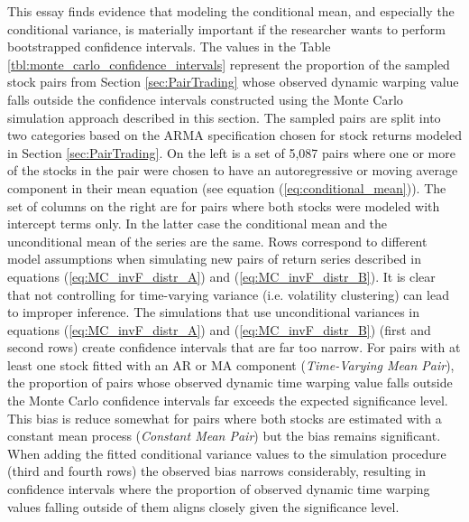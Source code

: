\documentclass[12pt]{report}
\begin{document}
This essay finds evidence that modeling the conditional mean, and especially the conditional variance, is materially important if the researcher wants to perform bootstrapped confidence intervals. The values in the Table \ref{tbl:monte_carlo_confidence_intervals} represent the proportion of the sampled stock pairs from Section \ref{sec:PairTrading} whose observed dynamic warping value falls outside the confidence intervals constructed using the Monte Carlo simulation approach described in this section. The sampled pairs are split into two categories based on the ARMA specification chosen for stock returns modeled in Section \ref{sec:PairTrading}. On the left is a set of 5,087 pairs where one or more of the stocks in the pair were chosen to have an autoregressive or moving average component in their mean equation (see equation (\ref{eq:conditional_mean})). The set of columns on the right are for pairs where both stocks were modeled with intercept terms only. In the latter case the conditional mean and the unconditional mean of the series are the same. Rows correspond to different model assumptions when simulating new pairs of return series described in equations (\ref{eq:MC_invF_distr_A}) and (\ref{eq:MC_invF_distr_B}). It is clear that not controlling for time-varying variance (i.e. volatility clustering) can lead to improper inference. The simulations that use unconditional variances in equations (\ref{eq:MC_invF_distr_A}) and (\ref{eq:MC_invF_distr_B}) (first and second rows) create confidence intervals that are far too narrow. For pairs with at least one stock fitted with an AR or MA component (\textit{Time-Varying Mean Pair}), the proportion of pairs whose observed dynamic time warping value falls outside the Monte Carlo confidence intervals far exceeds the expected significance level. This bias is reduce somewhat for pairs where both stocks are estimated with a constant mean process (\textit{Constant Mean Pair}) but the bias remains significant. When adding the fitted conditional variance values to the simulation procedure (third and fourth rows) the observed bias narrows considerably, resulting in confidence intervals where the proportion of observed dynamic time warping values falling outside of them aligns closely given the significance level. 
\end{document}
